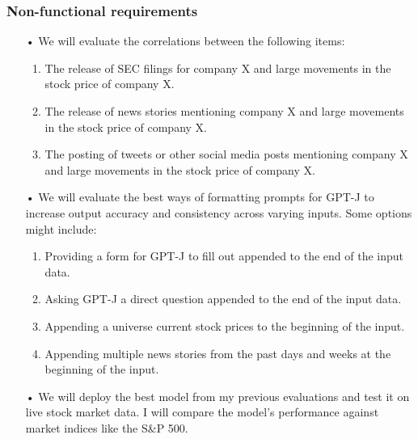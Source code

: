 \documentclass[conference]{IEEEtran}
\begin{document}
\subsubsection{Non-functional requirements}
\begin{enumerate}
    \item[•] We will evaluate the correlations between the following items:
    \begin{enumerate}
        \item The release of SEC filings for company X and large movements in the stock price of company X.
        \item The release of news stories mentioning company X and large movements in the stock price of company X.
        \item The posting of tweets or other social media posts mentioning company X and large movements in the stock price of company X.
    \end{enumerate}
    \item[•] We will evaluate the best ways of formatting prompts for GPT-J to increase output accuracy and consistency across varying inputs. Some options might include:
    \begin{enumerate}
        \item Providing a form for GPT-J to fill out appended to the end of the input data.
        \item Asking GPT-J a direct question appended to the end of the input data.
        \item Appending a universe current stock prices to the beginning of the input.
        \item Appending multiple news stories from the past days and weeks at the beginning of the input.
    \end{enumerate}
    \item[•] We will deploy the best model from my previous evaluations and test it on live stock market data. I will compare the model's performance against market indices like the S\&P 500. 
\end{enumerate}
\end{document}
